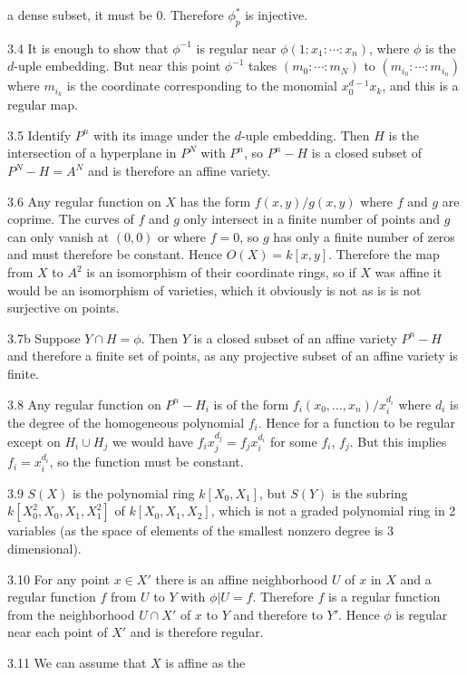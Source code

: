 a dense subset, it must be 0. Therefore $\phi_p^*$ is injective. 
\item{3.4} It is enough to show that $\phi^{-1}$ is regular near
$\phi(1:x_1:\cdots:x_n)$, where $\phi$ is the $d$-uple embedding. 
But near this point $\phi^{-1} $ takes
$(m_0:\cdots :m_N) $ to $(m_{i_0}:\cdots:m_{i_n})$ 
where $m_{i_k}$ is the coordinate corresponding to the monomial
$x_0^{d-1}x_k$, and this is a regular map. 
\item{3.5} Identify $P^n$ with its image under the
$d$-uple embedding. Then $H$ is the intersection of a 
hyperplane in $P^N$ with $P^n$, so $P^n-H$ is 
a closed subset of $P^N-H=A^N$ and is therefore an affine variety. 
\item{3.6} Any regular function on $X$ has the form $f(x,y)/g(x,y)$
where $f$ and $g$ are coprime. The curves of $f$ and $g$ only intersect
in a finite number of points and $g$ can only vanish at $(0,0)$
or where $f=0$, so $g$ has only a finite number of zeros and 
must therefore be constant. Hence $O(X)=k[x,y]$. Therefore
the map from $X$ to $A^2$ is an isomorphism of their coordinate rings, 
so if $X$ was affine it would be an isomorphism of varieties,
which it obviously is not as is is not surjective on points. 
\item{3.7b} Suppose $Y\cap H=\phi$. Then $Y$ is a closed subset of
an affine variety $P^n-H$ and therefore a finite set of points, 
as any projective subset of an affine variety is finite.
\item{3.8} Any regular function on $P^n-H_i$ 
is of the form $f_i(x_0,\ldots,x_n)/x_i^{d_i}$ where $d_i$ is the degree
of the homogeneous polynomial $f_i$. 
Hence for a function to be regular except on $H_i\cup H_j$
we would have $f_ix_j^{d_j}=f_jx_i^{d_i}$ for some $f_i$, $f_j$. 
But this implies $f_i=x_i^{d_i}$, so the function must be constant. 
\item{3.9} $S(X)$ is the polynomial ring $k[X_0, X_1]$, 
but $S(Y)$ is the subring $k[X_0^2,X_0,X_1,X_1^2] $ of
$k[X_0,X_1,X_2]$, which is not a graded polynomial ring
in 2 variables (as the space of elements of the smallest
nonzero degree is 3 dimensional). 
\item{3.10} For any point $x\in X'$ there is an affine neighborhood
$U$ of $x$ in $X$ and a regular function $f$ from $U$ to $Y$ 
with $\phi|U=f$. Therefore $f$ is a regular function from the
neighborhood $U\cap X'$ of $x$ to $Y$ and therefore to $Y'$. 
Hence $\phi$ is regular near each point of $X'$ and is therefore 
regular. 
\item{3.11} We can assume that $X$ is affine as the 
